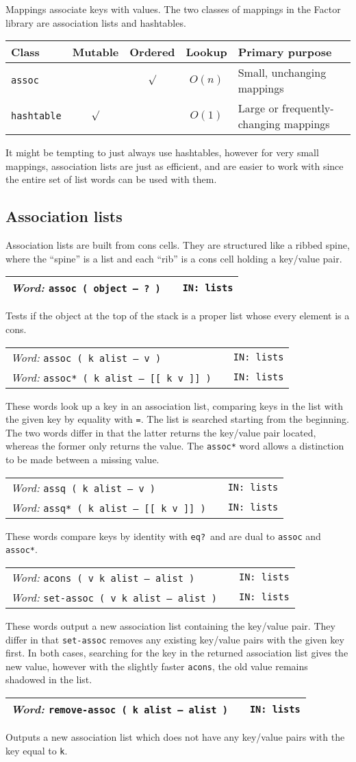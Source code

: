 \documentclass{report}
\newcommand{\ordinaryword}[3]{\index{#1}
\emph{Word:} \texttt{#2} &&\texttt{IN: #3}}
\newcommand{\wordtable}[1]{

\begin{tabularx}{12cm}[t]{lXr}
\hline
#1\\
\hline
\end{tabularx}

}
\begin{document}
Mappings associate keys with values. The two classes of mappings in the Factor library are association lists and hashtables.

\begin{tabular}[t]{l|c|c|c|l}
Class&Mutable&Ordered&Lookup&Primary purpose\\
\hline
\texttt{assoc}&&$\surd$&$O(n)$&Small, unchanging mappings\\
\texttt{hashtable}&$\surd$&&$O(1)$&Large or frequently-changing mappings
\end{tabular}

It might be tempting to just always use hashtables, however for very small mappings, association lists are just as efficient, and are easier to work with since the entire set of list words can be used with them.

\subsection{Association lists}


Association lists are built from cons cells. They are structured like a ribbed spine, where the ``spine'' is a list and each ``rib'' is a cons cell holding a key/value pair.

\wordtable{
\ordinaryword{assoc?}{assoc ( object -- ?~)}{lists}
}
Tests if the object at the top of the stack is a proper list whose every element is a cons.

\wordtable{
\ordinaryword{assoc}{assoc ( k alist -- v )}{lists}\\
\ordinaryword{assoc*}{assoc* ( k alist -- [[ k v ]] )}{lists}
}
These words look up a key in an association list, comparing keys in the list with the given key by equality with \texttt{=}. The list is searched starting from the beginning. The two words differ in that the latter returns the key/value pair located, whereas the former only returns the value. The \texttt{assoc*} word allows a distinction to be made between a missing value.
\wordtable{
\ordinaryword{assq}{assq ( k alist -- v )}{lists}\\
\ordinaryword{assq*}{assq* ( k alist -- [[ k v ]] )}{lists}
}
These words compare keys by identity with \texttt{eq?}~and are dual to \texttt{assoc} and \texttt{assoc*}.
\wordtable{
\ordinaryword{acons}{acons ( v k alist -- alist )}{lists}\\
\ordinaryword{set-assoc}{set-assoc ( v k alist -- alist )}{lists}
}
These words output a new association list containing the key/value pair.
They differ in that \texttt{set-assoc} removes any existing key/value pairs with the given key first. In both cases, searching for the key in the returned association list gives the new value, however with the slightly faster \texttt{acons}, the old value remains shadowed in the list.
\wordtable{
\ordinaryword{remove-assoc}{remove-assoc ( k alist -- alist )}{lists}
}
Outputs a new association list which does not have any key/value pairs with the key equal to \texttt{k}.
\end{document}
